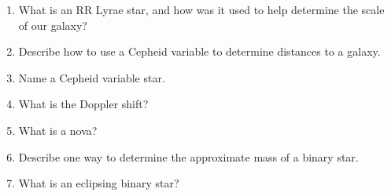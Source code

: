 
\begin{enumerate}
\item What is an RR Lyrae star, and how was it used to help determine
  the scale of our galaxy?
\vspace{80pt}
\item Describe how to use a Cepheid variable to determine distances to
  a galaxy.
\vspace{80pt}
\item Name a Cepheid variable star.
\vspace{80pt}
\item What is the Doppler shift? 
\vspace{80pt}
\item What is a nova?
\vspace{80pt}
\item Describe one way to determine the approximate mass of a binary
  star.
\vspace{80pt}
\item What is an eclipsing binary star?
\vspace{80pt}
\end{enumerate}
